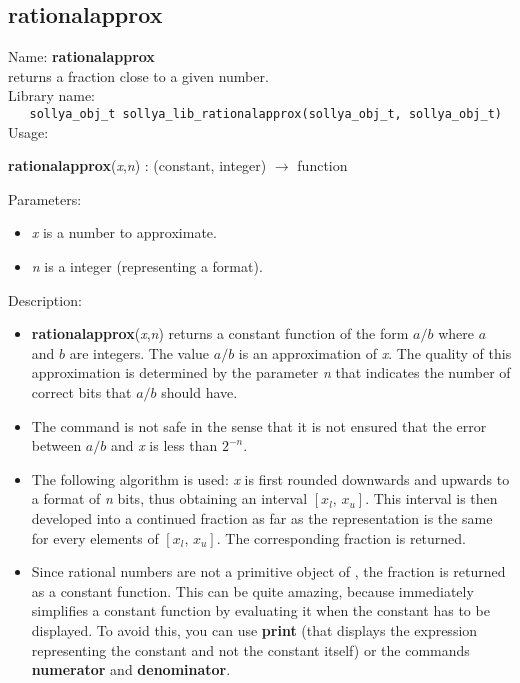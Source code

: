 \subsection{rationalapprox}
\label{labrationalapprox}
\noindent Name: \textbf{rationalapprox}\\
\phantom{aaa}returns a fraction close to a given number.\\[0.2cm]
\noindent Library name:\\
\verb|   sollya_obj_t sollya_lib_rationalapprox(sollya_obj_t, sollya_obj_t)|\\[0.2cm]
\noindent Usage: 
\begin{center}
\textbf{rationalapprox}(\emph{x},\emph{n}) : (\textsf{constant}, \textsf{integer}) $\rightarrow$ \textsf{function}\\
\end{center}
Parameters: 
\begin{itemize}
\item \emph{x} is a number to approximate.
\item \emph{n} is a integer (representing a format).
\end{itemize}
\noindent Description: \begin{itemize}

\item \textbf{rationalapprox}(\emph{x},\emph{n}) returns a constant function of the form $a/b$ where $a$ and $b$ are
   integers. The value $a/b$ is an approximation of \emph{x}. The quality of this 
   approximation is determined by the parameter \emph{n} that indicates the number of
   correct bits that $a/b$ should have.

\item The command is not safe in the sense that it is not ensured that the error 
   between $a/b$ and \emph{x} is less than $2^{-n}$.

\item The following algorithm is used: \emph{x} is first rounded downwards and upwards to
   a format of \emph{n} bits, thus obtaining an interval $[x_l,\,x_u]$. This interval is then
   developed into a continued fraction as far as the representation is the same
   for every elements of $[x_l,\,x_u]$. The corresponding fraction is returned.

\item Since rational numbers are not a primitive object of \sollya, the fraction is
   returned as a constant function. This can be quite amazing, because \sollya
   immediately simplifies a constant function by evaluating it when the constant
   has to be displayed.
   To avoid this, you can use \textbf{print} (that displays the expression representing
   the constant and not the constant itself) or the commands \textbf{numerator} 
   and \textbf{denominator}.
\end{itemize}
